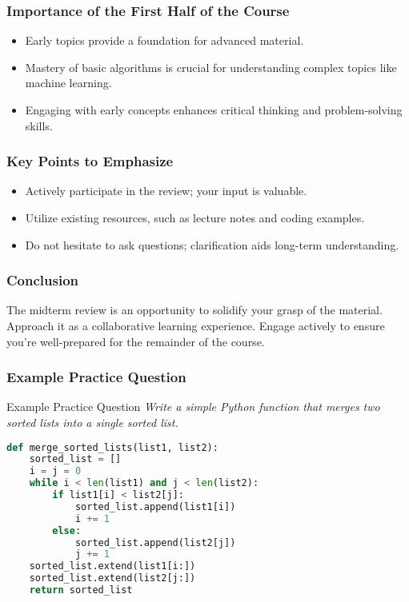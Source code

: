 \documentclass[aspectratio=169]{beamer}
\begin{document}
\begin{frame}[fragile]
  \frametitle{Importance of the First Half of the Course}
  \begin{itemize}
    \item Early topics provide a foundation for advanced material.
    \item Mastery of basic algorithms is crucial for understanding complex topics like machine learning.
    \item Engaging with early concepts enhances critical thinking and problem-solving skills.
  \end{itemize}
\end{frame}

\begin{frame}[fragile]
  \frametitle{Key Points to Emphasize}
  \begin{itemize}
    \item Actively participate in the review; your input is valuable.
    \item Utilize existing resources, such as lecture notes and coding examples.
    \item Do not hesitate to ask questions; clarification aids long-term understanding.
  \end{itemize}
\end{frame}

\begin{frame}[fragile]
  \frametitle{Conclusion}
  The midterm review is an opportunity to solidify your grasp of the material. Approach it as a collaborative learning experience. Engage actively to ensure you're well-prepared for the remainder of the course.
\end{frame}

\begin{frame}[fragile]
  \frametitle{Example Practice Question}
  \begin{block}{Example Practice Question}
    \textit{Write a simple Python function that merges two sorted lists into a single sorted list.}
  \end{block}
  
  \begin{lstlisting}[language=Python]
def merge_sorted_lists(list1, list2):
    sorted_list = []
    i = j = 0
    while i < len(list1) and j < len(list2):
        if list1[i] < list2[j]:
            sorted_list.append(list1[i])
            i += 1
        else:
            sorted_list.append(list2[j])
            j += 1
    sorted_list.extend(list1[i:])
    sorted_list.extend(list2[j:])
    return sorted_list
  \end{lstlisting}
\end{frame}
\end{document}
